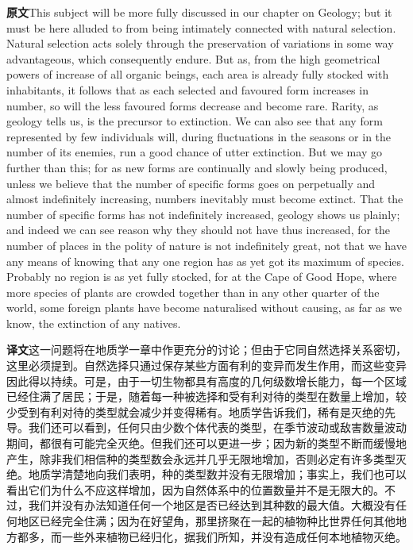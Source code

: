 \documentclass[UTF8,zihao=-4]{ctexart}
\newcommand{\BodyFont}{\fontsize{10.5pt}{15.5pt}\selectfont}
\newcommand{\origlabel}{\textbf{原文}\quad}
\newcommand{\translabel}{\textbf{译文}\quad}
\newenvironment{enblock}{\par\noindent\begingroup\BodyFont\origlabel}{\par\endgroup}
\newenvironment{zhblock}{\par\noindent\begingroup\BodyFont\translabel}{\par\endgroup\vspace{0.35em}}
\newcommand{\pair}[2]{\begin{enblock}#1\end{enblock}\begin{zhblock}#2\end{zhblock}}
\begin{document}
\pair{This subject will be more fully discussed in our chapter on Geology; but it must be here alluded to from being intimately connected with natural selection. Natural selection acts solely through the preservation of variations in some way advantageous, which consequently endure. But as, from the high geometrical powers of increase of all organic beings, each area is already fully stocked with inhabitants, it follows that as each selected and favoured form increases in number, so will the less favoured forms decrease and become rare. Rarity, as geology tells us, is the precursor to extinction. We can also see that any form represented by few individuals will, during fluctuations in the seasons or in the number of its enemies, run a good chance of utter extinction. But we may go further than this; for as new forms are continually and slowly being produced, unless we believe that the number of specific forms goes on perpetually and almost indefinitely increasing, numbers inevitably must become extinct. That the number of specific forms has not indefinitely increased, geology shows us plainly; and indeed we can see reason why they should not have thus increased, for the number of places in the polity of nature is not indefinitely great, not that we have any means of knowing that any one region has as yet got its maximum of species. Probably no region is as yet fully stocked, for at the Cape of Good Hope, where more species of plants are crowded together than in any other quarter of the world, some foreign plants have become naturalised without causing, as far as we know, the extinction of any natives.}{这一问题将在地质学一章中作更充分的讨论；但由于它同自然选择关系密切，这里必须提到。自然选择只通过保存某些方面有利的变异而发生作用，而这些变异因此得以持续。可是，由于一切生物都具有高度的几何级数增长能力，每一个区域已经住满了居民；于是，随着每一种被选择和受有利对待的类型在数量上增加，较少受到有利对待的类型就会减少并变得稀有。地质学告诉我们，稀有是灭绝的先导。我们还可以看到，任何只由少数个体代表的类型，在季节波动或敌害数量波动期间，都很有可能完全灭绝。但我们还可以更进一步；因为新的类型不断而缓慢地产生，除非我们相信种的类型数会永远并几乎无限地增加，否则必定有许多类型灭绝。地质学清楚地向我们表明，种的类型数并没有无限增加；事实上，我们也可以看出它们为什么不应这样增加，因为自然体系中的位置数量并不是无限大的。不过，我们并没有办法知道任何一个地区是否已经达到其种数的最大值。大概没有任何地区已经完全住满；因为在好望角，那里挤聚在一起的植物种比世界任何其他地方都多，而一些外来植物已经归化，据我们所知，并没有造成任何本地植物灭绝。}
\end{document}

